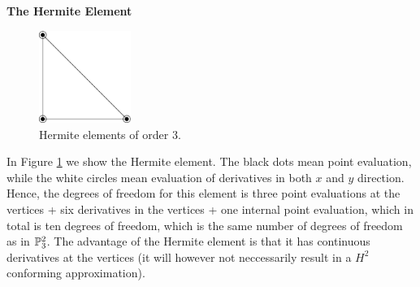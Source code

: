 \begin{example}{\bf{ The Hermite Element}} \\
\begin{figure}[htb]
\begin{center}
 \includegraphics[height=3cm]{chapters/kirby-1/eps/H1.xfig.eps} 
\caption{Hermite elements of order 3.}
\label{Hermite}
\end{center}
\end{figure}
In Figure \ref{Hermite} we show the Hermite element. The black dots mean point 
evaluation, while the white circles mean evaluation of derivatives in both $x$ and
$y$ direction. Hence, the degrees of freedom for this element is three point evaluations
at the vertices +  six derivatives in the vertices + one internal point
evaluation, which in total is ten degrees of freedom, which is the same number
of degrees of freedom as in $\P^2_3$.  The advantage of the Hermite element
is that it has continuous derivatives at the vertices (it will however
not neccessarily result in a $H^2$ conforming approximation). 
\end{example}

